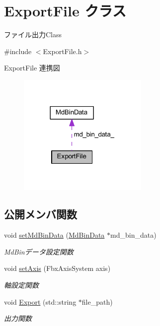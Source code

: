\hypertarget{class_export_file}{}\section{Export\+File クラス}
\label{class_export_file}


ファイル出力\+Class  




{\ttfamily \#include $<$Export\+File.\+h$>$}



Export\+File 連携図
\nopagebreak
\begin{figure}[H]
\begin{center}
\leavevmode
\includegraphics[width=177pt]{class_export_file__coll__graph}
\end{center}
\end{figure}
\subsection*{公開メンバ関数}
\begin{DoxyCompactItemize}
\item 
void \mbox{\hyperlink{class_export_file_a8b1ef14ae42180a8bf491d4d7a4ceb63}{set\+Md\+Bin\+Data}} (\mbox{\hyperlink{class_md_bin_data}{Md\+Bin\+Data}} $\ast$md\+\_\+bin\+\_\+data)
\begin{DoxyCompactList}\small\item\em Md\+Binデータ設定関数 \end{DoxyCompactList}\item 
void \mbox{\hyperlink{class_export_file_a9dd6b27de162bee08b51eb2ae62d8e17}{set\+Axis}} (Fbx\+Axis\+System axis)
\begin{DoxyCompactList}\small\item\em 軸設定関数 \end{DoxyCompactList}\item 
void \mbox{\hyperlink{class_export_file_aadb97e06e12bbe978e5527b4b540ece8}{Export}} (std\+::string $\ast$file\+\_\+path)
\begin{DoxyCompactList}\small\item\em 出力関数 \end{DoxyCompactList}\end{DoxyCompactItemize}
